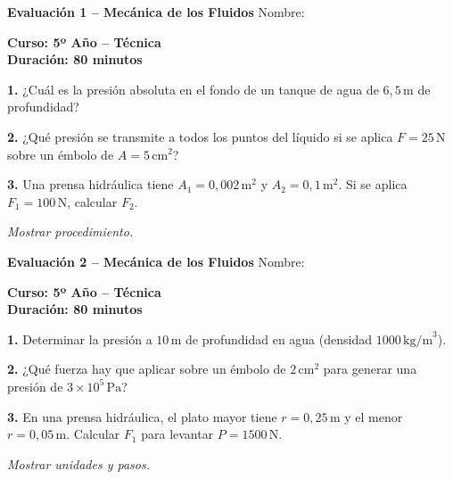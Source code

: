 \documentclass[10pt]{article}
\begin{document}
\begin{minipage}[t][0.23\textheight][t]{0.48\textwidth}
\textbf{Evaluación 1 – Mecánica de los Fluidos} \hfill Nombre: \hrulefill

\vspace{1mm}
\textbf{Curso: 5º Año – Técnica} \\
\textbf{Duración: 80 minutos}

\vspace{2mm}
\textbf{1.} ¿Cuál es la presión absoluta en el fondo de un tanque de agua de $6,5\,\text{m}$ de profundidad?

\vspace{2mm}
\textbf{2.} ¿Qué presión se transmite a todos los puntos del líquido si se aplica $F=25\,\text{N}$ sobre un émbolo de $A=5\,\text{cm}^2$?

\vspace{2mm}
\textbf{3.} Una prensa hidráulica tiene $A_1=0{,}002\,\text{m}^2$ y $A_2=0{,}1\,\text{m}^2$. Si se aplica $F_1=100\,\text{N}$, calcular $F_2$.

\vfill
\textit{Mostrar procedimiento.}
\end{minipage}
\hfill
\begin{minipage}[t][0.23\textheight][t]{0.48\textwidth}
\textbf{Evaluación 2 – Mecánica de los Fluidos} \hfill Nombre: \hrulefill

\vspace{1mm}
\textbf{Curso: 5º Año – Técnica} \\
\textbf{Duración: 80 minutos}

\vspace{2mm}
\textbf{1.} Determinar la presión a $10\,\text{m}$ de profundidad en agua (densidad $1000\,\text{kg/m}^3$).

\vspace{2mm}
\textbf{2.} ¿Qué fuerza hay que aplicar sobre un émbolo de $2\,\text{cm}^2$ para generar una presión de $3\times10^5\,\text{Pa}$?

\vspace{2mm}
\textbf{3.} En una prensa hidráulica, el plato mayor tiene $r=0{,}25\,\text{m}$ y el menor $r=0{,}05\,\text{m}$. Calcular $F_1$ para levantar $P=1500\,\text{N}$.

\vfill
\textit{Mostrar unidades y pasos.}
\end{minipage}

\vspace{4mm}
\end{document}
